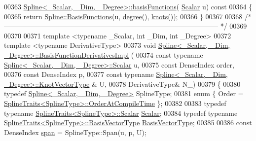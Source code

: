 \begin{DoxyCode}
00363     \hyperlink{group___splines___module_afe0997f0bb02a3fac3073016abac04c6}{Spline<\_Scalar, \_Dim, \_Degree>::basisFunctions}(
      \hyperlink{group___splines___module_a8cafd78b564825c76fbb3419653d9742}{Scalar} u)\textcolor{keyword}{ const}
00364 \textcolor{keyword}{  }\{
00365     \textcolor{keywordflow}{return} \hyperlink{group___splines___module_a038506788499d71aedddc5211c33bb6e}{Spline::BasisFunctions}(u, \hyperlink{group___splines___module_a0df23e941ac0f31dcd095a4dd4f4a7ec}{degree}(), \hyperlink{group___splines___module_ae3eac8af580ad880d8ad3a259d453aa1}{knots}());
00366   \}
00367 
00368   \textcolor{comment}{/* --------------------------------------------------------------------------------------------- */}
00369   
00370   
00371   \textcolor{keyword}{template} <\textcolor{keyword}{typename} \_Scalar, \textcolor{keywordtype}{int} \_Dim, \textcolor{keywordtype}{int} \_Degree>
00372   \textcolor{keyword}{template} <\textcolor{keyword}{typename} DerivativeType>
00373   \textcolor{keywordtype}{void} \hyperlink{group___splines___module_class_eigen_1_1_spline}{Spline<\_Scalar, \_Dim, \_Degree>::BasisFunctionDerivativesImpl}
      (
00374     \textcolor{keyword}{const} \textcolor{keyword}{typename} \hyperlink{group___splines___module_a8cafd78b564825c76fbb3419653d9742}{Spline<\_Scalar, \_Dim, \_Degree>::Scalar} u,
00375     \textcolor{keyword}{const} DenseIndex order,
00376     \textcolor{keyword}{const} DenseIndex p, 
00377     \textcolor{keyword}{const} \textcolor{keyword}{typename} \hyperlink{group___splines___module_a066f7a8b120316c9068b559f0790e9ec}{Spline<\_Scalar, \_Dim, \_Degree>::KnotVectorType}
      & U,
00378     DerivativeType& N\_)
00379   \{
00380     \textcolor{keyword}{typedef} \hyperlink{group___splines___module_class_eigen_1_1_spline}{Spline<\_Scalar, \_Dim, \_Degree>} SplineType;
00381     \textcolor{keyword}{enum} \{ Order = \hyperlink{struct_eigen_1_1_spline_traits}{SplineTraits<SplineType>::OrderAtCompileTime}
       \};
00382 
00383     \textcolor{keyword}{typedef} \textcolor{keyword}{typename} \hyperlink{struct_eigen_1_1_spline_traits}{SplineTraits<SplineType>::Scalar} 
      \hyperlink{group___splines___module_a8cafd78b564825c76fbb3419653d9742}{Scalar};
00384     \textcolor{keyword}{typedef} \textcolor{keyword}{typename} \hyperlink{struct_eigen_1_1_spline_traits}{SplineTraits<SplineType>::BasisVectorType} 
      \hyperlink{group___splines___module_a1d49cef942ea59d85d1711ee32354e6b}{BasisVectorType};
00385   
00386     \textcolor{keyword}{const} DenseIndex \hyperlink{group___splines___module_ab62751802b4cc237aadb0dbf3455df98}{span} = SplineType::Span(u, p, U);

\end{DoxyCode}
